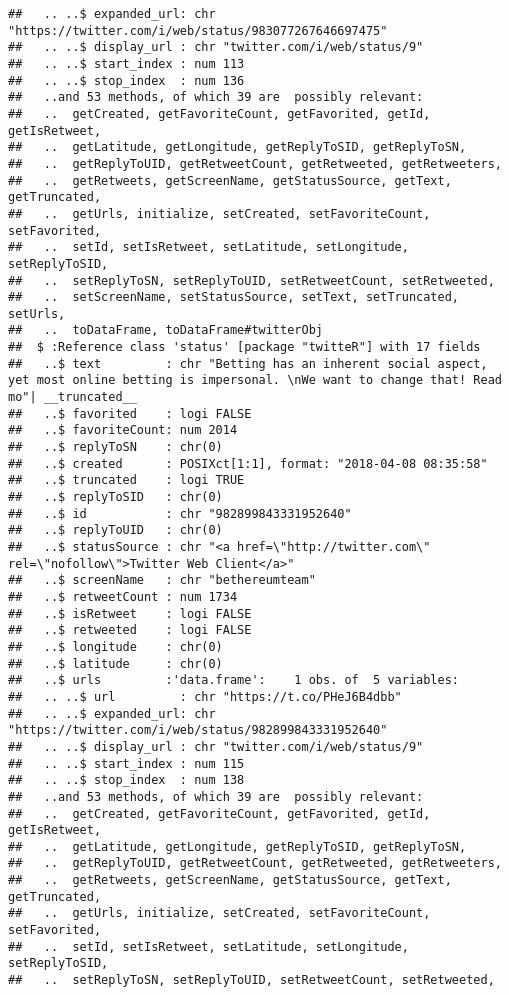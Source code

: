 \documentclass[]{article}
\begin{document}
\begin{verbatim}
##   .. ..$ expanded_url: chr "https://twitter.com/i/web/status/983077267646697475"
##   .. ..$ display_url : chr "twitter.com/i/web/status/9"
##   .. ..$ start_index : num 113
##   .. ..$ stop_index  : num 136
##   ..and 53 methods, of which 39 are  possibly relevant:
##   ..  getCreated, getFavoriteCount, getFavorited, getId, getIsRetweet,
##   ..  getLatitude, getLongitude, getReplyToSID, getReplyToSN,
##   ..  getReplyToUID, getRetweetCount, getRetweeted, getRetweeters,
##   ..  getRetweets, getScreenName, getStatusSource, getText, getTruncated,
##   ..  getUrls, initialize, setCreated, setFavoriteCount, setFavorited,
##   ..  setId, setIsRetweet, setLatitude, setLongitude, setReplyToSID,
##   ..  setReplyToSN, setReplyToUID, setRetweetCount, setRetweeted,
##   ..  setScreenName, setStatusSource, setText, setTruncated, setUrls,
##   ..  toDataFrame, toDataFrame#twitterObj
##  $ :Reference class 'status' [package "twitteR"] with 17 fields
##   ..$ text         : chr "Betting has an inherent social aspect, yet most online betting is impersonal. \nWe want to change that! Read mo"| __truncated__
##   ..$ favorited    : logi FALSE
##   ..$ favoriteCount: num 2014
##   ..$ replyToSN    : chr(0) 
##   ..$ created      : POSIXct[1:1], format: "2018-04-08 08:35:58"
##   ..$ truncated    : logi TRUE
##   ..$ replyToSID   : chr(0) 
##   ..$ id           : chr "982899843331952640"
##   ..$ replyToUID   : chr(0) 
##   ..$ statusSource : chr "<a href=\"http://twitter.com\" rel=\"nofollow\">Twitter Web Client</a>"
##   ..$ screenName   : chr "bethereumteam"
##   ..$ retweetCount : num 1734
##   ..$ isRetweet    : logi FALSE
##   ..$ retweeted    : logi FALSE
##   ..$ longitude    : chr(0) 
##   ..$ latitude     : chr(0) 
##   ..$ urls         :'data.frame':    1 obs. of  5 variables:
##   .. ..$ url         : chr "https://t.co/PHeJ6B4dbb"
##   .. ..$ expanded_url: chr "https://twitter.com/i/web/status/982899843331952640"
##   .. ..$ display_url : chr "twitter.com/i/web/status/9"
##   .. ..$ start_index : num 115
##   .. ..$ stop_index  : num 138
##   ..and 53 methods, of which 39 are  possibly relevant:
##   ..  getCreated, getFavoriteCount, getFavorited, getId, getIsRetweet,
##   ..  getLatitude, getLongitude, getReplyToSID, getReplyToSN,
##   ..  getReplyToUID, getRetweetCount, getRetweeted, getRetweeters,
##   ..  getRetweets, getScreenName, getStatusSource, getText, getTruncated,
##   ..  getUrls, initialize, setCreated, setFavoriteCount, setFavorited,
##   ..  setId, setIsRetweet, setLatitude, setLongitude, setReplyToSID,
##   ..  setReplyToSN, setReplyToUID, setRetweetCount, setRetweeted,

\end{verbatim}
\end{document}
